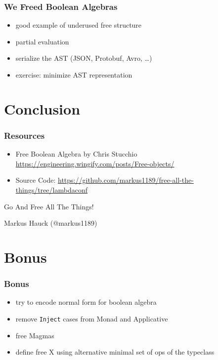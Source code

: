 \documentclass{beamer}
\begin{document}
\begin{frame}
  \frametitle{We Freed Boolean Algebras}
  \begin{itemize}
  \item good example of underused free structure
  \item partial evaluation
  \item serialize the AST (JSON, Protobuf, Avro, \ldots{})
  \item exercise: minimize AST representation
  \end{itemize}
\end{frame}

\section{Conclusion}\label{sec:conclusion}

\begin{frame}
  \frametitle{Resources}
  \begin{itemize}
  \item Free Boolean Algebra by Chris Stucchio \url{https://engineering.wingify.com/posts/Free-objects/}
  \item Source Code: \url{https://github.com/markus1189/free-all-the-things/tree/lambdaconf}
  \end{itemize}
\end{frame}

\begin{frame}
  \begin{center}
    \Huge
    Go And Free All The Things!
  \end{center}
  \begin{center}
    Markus Hauck (@markus1189)
  \end{center}
\end{frame}

\begin{frame}
  \tableofcontents{}
\end{frame}

\appendix{}

\section*{Bonus}\label{sec:bonus}

\begin{frame}
  \frametitle{Bonus}
  \begin{itemize}
  \item try to encode normal form for boolean algebra
  \item remove \texttt{Inject} cases from Monad and Applicative
  \item free Magmas
  \item define free X using alternative minimal set of ops of the typeclass
  \end{itemize}
\end{frame}
\end{document}
